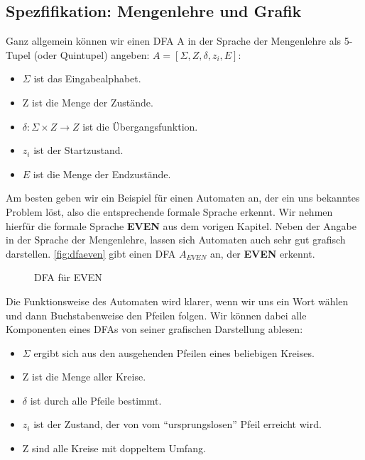 \subsection{Spezfifikation: Mengenlehre und Grafik}
Ganz allgemein können wir einen DFA A in der Sprache der Mengenlehre
als 5-Tupel (oder Quintupel) angeben: $A = [\Sigma, Z, \delta, z_i, E]$:
\begin{itemize}
    \item $\Sigma$ ist das Eingabealphabet.
    \item Z ist die Menge der Zustände.
    \item $\delta: \Sigma \times Z \rightarrow Z$ ist die Übergangsfunktion.
    \item $z_i$ ist der Startzustand.
    \item $E$ ist die Menge der Endzustände.
\end{itemize}

Am besten geben wir ein Beispiel für einen Automaten an,
der ein uns bekanntes Problem löst,
also die entsprechende formale Sprache erkennt.
Wir nehmen hierfür die formale Sprache \textbf{EVEN} aus dem vorigen Kapitel.
Neben der Angabe in der Sprache der Mengenlehre,
lassen sich Automaten auch sehr gut grafisch darstellen.
\autoref{fig:dfaeven} gibt einen DFA $A_{EVEN}$ an,
der \textbf{EVEN} erkennt.

\begin{figure}[ht] %
\centering %
\caption{DFA für EVEN}
\label{fig:dfaeven}
\end{figure}

Die Funktionsweise des Automaten wird klarer, wenn wir uns ein Wort wählen
und dann Buchstabenweise den Pfeilen folgen.
Wir können dabei alle Komponenten eines DFAs von seiner grafischen Darstellung ablesen:
\begin{itemize}
    \item $\Sigma$ ergibt sich aus den ausgehenden Pfeilen eines beliebigen Kreises.
    \item Z ist die Menge aller Kreise.
    \item $\delta$ ist durch alle Pfeile bestimmt.
    \item $z_i$ ist der Zustand,
        der von vom ``ursprungslosen'' Pfeil erreicht wird.
    \item Z sind alle Kreise mit doppeltem Umfang.
\end{itemize}


